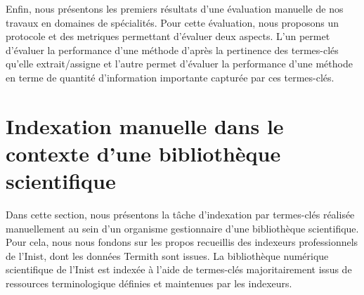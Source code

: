     Enfin, nous présentons les premiers résultats d'une évaluation manuelle de
    nos travaux en domaines de spécialités. Pour cette évaluation, nous
    proposons un protocole et des metriques permettant d'évaluer deux aspects.
    L'un permet d'évaluer la performance d'une méthode d'après la pertinence des
    termes-clés qu'elle extrait/assigne et l'autre permet d'évaluer la
    performance d'une méthode en terme de quantité d'information importante
    capturée par ces termes-clés.


  \section[Indexation manuelle dans le contexte d'une bibliothèque scientifique]{Indexation manuelle dans le contexte d'une bibliothèque\\scientifique}
  \label{sec:main-domain_specific_keyphrase_annotation-manual_keyphrase_annotation}
    Dans cette section, nous présentons la tâche d'indexation par termes-clés
    réalisée manuellement au sein d'un organisme gestionnaire d'une bibliothèque
    scientifique. Pour cela, nous nous fondons sur les propos recueillis des
    indexeurs professionnels de l'Inist, dont les données Termith sont issues.
    La bibliothèque numérique scientifique de l'Inist est indexée à l'aide de
    termes-clés majoritairement issus de ressources terminologique définies et
    maintenues par les indexeurs.

